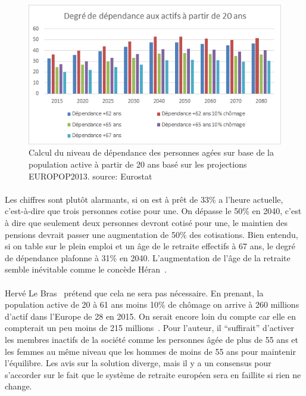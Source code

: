 \begin{figure}[h!]
    \begin{center}
        \includegraphics[scale=0.9]{document/real_dep.png}
        \caption{Calcul du niveau de dépendance des personnes agées sur base de la population active à partir de 20 ans basé sur les projections EUROPOP2013. source: Eurostat~\citep{eurostat_europop13}}
        \label{real_dep}
    \end{center}
\end{figure}

\paragraph{}Les chiffres sont plutôt alarmants, si on est à prêt de 33\% a l’heure actuelle, c’est-à-dire que trois personnes cotise pour une. On dépasse le 50\% en 2040, c’est à dire que seulement deux personnes devront cotisé pour une, le maintien des pensions devrait passer une augmentation de 50\% des cotisations. Bien entendu, si on table sur le plein emploi et un âge de le retraite effectifs à 67 ans, le degré de dépendance plafonne à 31\% en 2040. L’augmentation de l’âge de la retraite semble inévitable comme le concède Héran~\citep[pp.18]{heran}.

\paragraph{}Hervé Le Bras~\citep[pp.19-39]{heran} prétend que cela ne sera pas nécessaire. En prenant, la population active de 20 à 61 ans moins 10\% de chômage on arrive à 260 millions d’actif dans l’Europe de 28 en 2015. On serait encore loin du compte car elle en compterait un peu moins de 215 millions~\citep[pp.36]{heran}. Pour l’auteur, il “suffirait” d'activer les membres inactifs de la société comme les personnes âgée de plus de 55 ans et les femmes au même niveau que les hommes de moins de 55 ans pour maintenir l’équilibre. Les avis sur la solution diverge, mais il y a un consensus pour s’accorder sur le fait que le système de retraite européen sera en faillite si rien ne change. 

